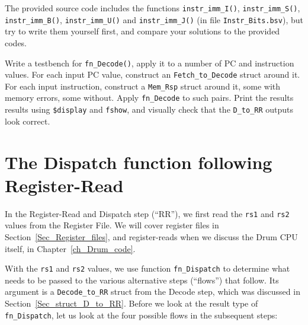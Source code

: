 \hdivider

\Exercise

The provided source code includes the functions \verb|instr_imm_I()|,
\verb|instr_imm_S()|, \verb|instr_imm_B()|, \verb|instr_imm_U()| and
\verb|instr_imm_J()| (in file \verb|Instr_Bits.bsv|), but try to write
them yourself first, and compare your solutions to the provided codes.

\Exercise

Write a testbench for \verb|fn_Decode()|, apply it to a number of PC
and instruction values.  For each input PC value, construct an
\verb|Fetch_to_Decode| struct around it.  For each input instruction,
construct a \verb|Mem_Rsp| struct around it, some with memory errors,
some without.  Apply \verb|fn_Decode| to such pairs.  Print the
results results using \verb|$display| and \verb|fshow|, and visually
check that the \verb|D_to_RR| outputs look correct.

\Endexercise


\section{The Dispatch function following Register-Read}

\label{Sec_Dispatch_function}


In the Register-Read and Dispatch step (``RR''), we first read the
\verb|rs1| and \verb|rs2| values from the Register File.  We will
cover register files in Section~\ref{Sec_Register_files}, and
register-reads when we discuss the Drum CPU itself, in
Chapter~\ref{ch_Drum_code}.

With the \verb|rs1| and \verb|rs2| values, we use function
\verb|fn_Dispatch| to determine what needs to be passed to the various
alternative steps (``flows'') that follow.  Its argument is a
\verb|Decode_to_RR| struct from the Decode step, which was discussed
in Section~\ref{Sec_struct_D_to_RR}.  Before we look at the result
type of \verb|fn_Dispatch|, let us look at the four possible flows in
the subsequent steps:

